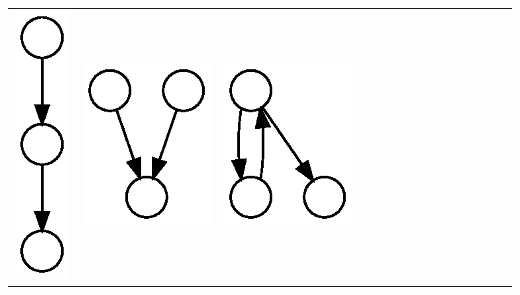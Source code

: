 \begin{table}[t!]
\begin{tabular}{l|lllllllllllll}
    \includegraphics[height=0.03\textheight]{M9-plain} &
    \includegraphics[height=0.03\textheight]{M10-plain} &
    \includegraphics[height=0.03\textheight]{M11-plain} &

\end{tabular}
\end{table}

